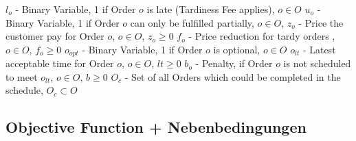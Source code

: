 \documentclass[a4paper,12pt,twoside]{scrreprt}
\begin{document}
\begin{flushleft}
$l_{o}$ - Binary Variable, 1 if Order $o$ is late (Tardiness Fee applies), $o \in O$ \linebreak
$u_{o}$ - Binary Variable, 1 if Order $o$ can only be fulfilled partially, $o \in O$, \linebreak
$z_{o}$ - Price the customer pay for Order $o$, $o \in O$, $z_{o} \geq 0$ \linebreak
$f_{o}$ - Price reduction for tardy orders , $o \in O$, $f_{o} \geq 0$ \linebreak
$o_{opt}$ - Binary Variable, 1 if Order $o$ is optional, $o \in O$ \linebreak
$o_{lt}$ - Latest acceptable time for Order $o$, $o \in O$, $lt \geq 0$ \linebreak
$b_{o}$ - Penalty, if Order $o$ is not scheduled to meet $o_{lt}$, $o \in O$, $b \geq 0$ \linebreak
$O_{c}$ - Set of all Orders which could be completed in the schedule, $O_{c} \subset O$ \linebreak


\end{flushleft}

\subsection*{Objective Function + Nebenbedingungen}
\end{document}
